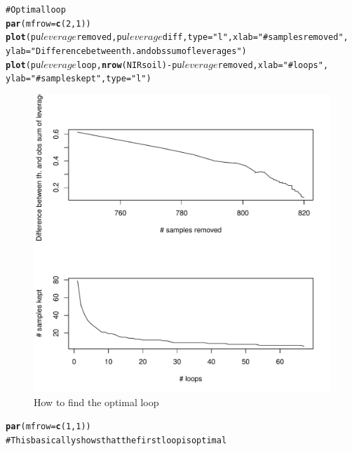 \documentclass[12pt]{article}\usepackage{graphicx, color}
\makeatletter
\def\maxwidth{ %
  \ifdim\Gin@nat@width>\linewidth
    \linewidth
  \else
    \Gin@nat@width
  \fi
}
\newcommand{\hlfunctioncall}[1]{\textcolor[rgb]{0.501960784313725,0,0.329411764705882}{\textbf{#1}}}%
\newcommand{\hlstring}[1]{\textcolor[rgb]{0.6,0.6,1}{#1}}%
\newcommand{\hlcomment}[1]{\textcolor[rgb]{0.180392156862745,0.6,0.341176470588235}{#1}}%
\newenvironment{kframe}{%
 \def\at@end@of@kframe{}%
 \ifinner\ifhmode%
  \def\at@end@of@kframe{\end{minipage}}%
  \begin{minipage}{\columnwidth}%
 \fi\fi%
 \def\FrameCommand##1{\hskip\@totalleftmargin \hskip-\fboxsep
 \colorbox{shadecolor}{##1}\hskip-\fboxsep
     \hskip-\linewidth \hskip-\@totalleftmargin \hskip\columnwidth}%
 \MakeFramed {\advance\hsize-\width
   \@totalleftmargin\z@ \linewidth\hsize
   \@setminipage}}%
 {\par\unskip\endMakeFramed%
 \at@end@of@kframe}
\newenvironment{knitrout}{}{} %
\makeatother
\begin{document}
\begin{knitrout}
\color{fgcolor}\begin{kframe}
\begin{alltt}
\hlcomment{# Optimal loop}
\hlfunctioncall{par}(mfrow = \hlfunctioncall{c}(2, 1))
\hlfunctioncall{plot}(pu$leverage$removed, pu$leverage$diff, type = \hlstring{"l"}, xlab = \hlstring{"# samples removed"}, 
    ylab = \hlstring{"Difference between th. and obs sum of leverages"})
\hlfunctioncall{plot}(pu$leverage$loop, \hlfunctioncall{nrow}(NIRsoil) - pu$leverage$removed, xlab = \hlstring{"# loops"}, 
    ylab = \hlstring{"# samples kept"}, type = \hlstring{"l"})
\end{alltt}
\end{kframe}\begin{figure}[]

\includegraphics[width=\maxwidth]{figure/puchwein2} \caption[How to find the optimal loop]{How to find the optimal loop\label{fig:puchwein2}}
\end{figure}

\begin{kframe}\begin{alltt}
\hlfunctioncall{par}(mfrow = \hlfunctioncall{c}(1, 1))
\hlcomment{# This basically shows that the first loop is optimal}
\end{alltt}
\end{kframe}
\end{knitrout}
\end{document}
